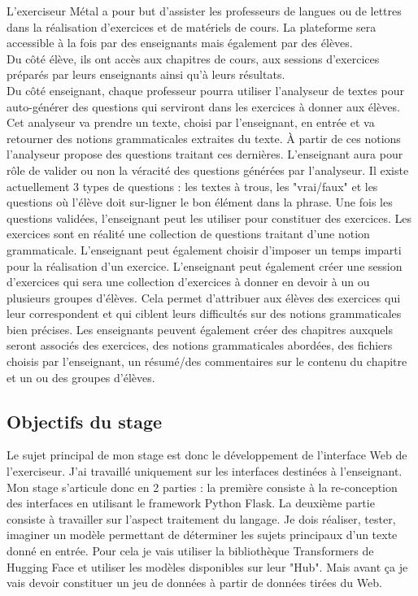 \documentclass[12pt]{article}
\begin{document}
L'exerciseur Métal a pour but d'assister les professeurs de langues ou de lettres dans la réalisation d'exercices et de matériels de cours. La plateforme sera accessible à la fois par des enseignants mais également par des élèves. \\
Du côté élève, ils ont accès aux chapitres de cours, aux sessions d'exercices préparés par leurs enseignants ainsi qu'à leurs résultats. \\
Du côté enseignant, chaque professeur pourra utiliser l'analyseur de textes pour auto-générer des questions qui serviront dans les exercices à donner aux élèves. Cet analyseur va prendre un texte, choisi par l'enseignant, en entrée et va retourner des notions grammaticales extraites du texte. À partir de ces notions l'analyseur propose des questions traitant ces dernières. L'enseignant aura pour rôle de valider ou non la véracité des questions générées par l'analyseur. Il existe actuellement 3 types de questions : les textes à trous, les "vrai/faux" et les questions où l'élève doit sur-ligner le bon élément dans la phrase. 
Une fois les questions validées, l'enseignant peut les utiliser pour constituer des exercices. Les exercices sont en réalité une collection de questions traitant d'une notion grammaticale. L'enseignant peut également choisir d'imposer un temps imparti pour la réalisation d'un exercice.
L'enseignant peut également créer une session d'exercices qui sera une collection d'exercices à donner en devoir à un ou plusieurs groupes d'élèves. Cela permet d'attribuer aux élèves des exercices qui leur correspondent et qui ciblent leurs difficultés sur des notions grammaticales bien précises.
Les enseignants peuvent également créer des chapitres auxquels seront associés des exercices, des notions grammaticales abordées, des fichiers choisis par l'enseignant, un résumé/des commentaires sur le contenu du chapitre et un ou des groupes d'élèves.

\subsection{Objectifs du stage}

Le sujet principal de mon stage est donc le développement de l'interface Web de l'exerciseur. J'ai travaillé uniquement sur les interfaces destinées à l'enseignant. 
Mon stage s’articule donc en 2 parties : la première consiste à la re-conception des interfaces en utilisant le framework Python Flask. La deuxième partie consiste à travailler sur l’aspect traitement du langage. Je dois réaliser, tester, imaginer un modèle permettant de déterminer les sujets principaux d'un texte donné en entrée. Pour cela je vais utiliser la bibliothèque Transformers de Hugging Face et utiliser les modèles disponibles sur leur "Hub". Mais avant ça je vais devoir constituer un jeu de données à partir de données tirées du Web.
\end{document}
